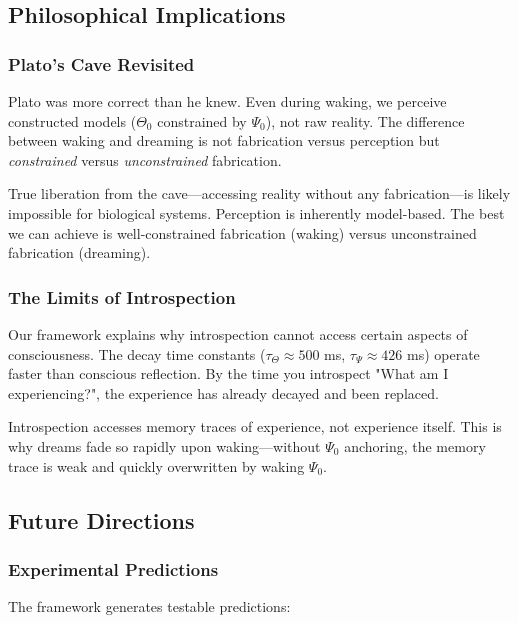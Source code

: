 \documentclass[11pt,a4paper]{article}
\begin{document}
\subsection{Philosophical Implications}

\subsubsection{Plato's Cave Revisited}

Plato was more correct than he knew. Even during waking, we perceive constructed models ($\Theta_0$ constrained by $\Psi_0$), not raw reality. The difference between waking and dreaming is not fabrication versus perception but \textit{constrained} versus \textit{unconstrained} fabrication.

True liberation from the cave—accessing reality without any fabrication—is likely impossible for biological systems. Perception is inherently model-based. The best we can achieve is well-constrained fabrication (waking) versus unconstrained fabrication (dreaming).

\subsubsection{The Limits of Introspection}

Our framework explains why introspection cannot access certain aspects of consciousness. The decay time constants ($\tau_{\Theta} \approx 500$ ms, $\tau_{\Psi} \approx 426$ ms) operate faster than conscious reflection. By the time you introspect "What am I experiencing?", the experience has already decayed and been replaced.

Introspection accesses memory traces of experience, not experience itself. This is why dreams fade so rapidly upon waking—without $\Psi_0$ anchoring, the memory trace is weak and quickly overwritten by waking $\Psi_0$.

\subsection{Future Directions}

\subsubsection{Experimental Predictions}

The framework generates testable predictions:
\end{document}

